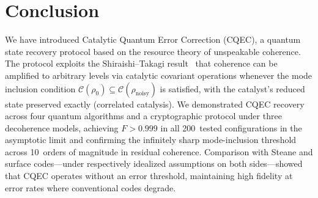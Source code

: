 \documentclass[prx,twocolumn,superscriptaddress,longbibliography,floatfix]{revtex4-2}
\begin{document}
\section{Conclusion}
\label{sec:conclusion}

We have introduced Catalytic Quantum Error Correction (CQEC), a quantum state recovery protocol based on the resource theory of unspeakable coherence.
The protocol exploits the Shiraishi--Takagi result~\cite{Shiraishi2024} that coherence can be amplified to arbitrary levels via catalytic covariant operations whenever the mode inclusion condition $\mathcal{C}(\rho_0) \subseteq \mathcal{C}(\rho_\mathrm{noisy})$ is satisfied, with the catalyst's reduced state preserved exactly (correlated catalysis).
We demonstrated CQEC recovery across four quantum algorithms and a cryptographic protocol under three decoherence models, achieving $F > 0.999$ in all 200~tested configurations in the asymptotic limit and confirming the infinitely sharp mode-inclusion threshold across 10~orders of magnitude in residual coherence.
Comparison with Steane and surface codes---under respectively idealized assumptions on both sides---showed that CQEC operates without an error threshold, maintaining high fidelity at error rates where conventional codes degrade.
\end{document}
